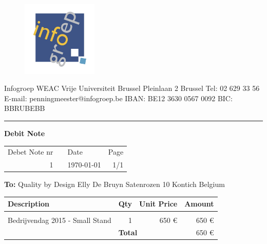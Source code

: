 \documentclass{letter}
\begin{document}
\begin{figure}
  \begin{center}
    \includegraphics[width=0.32\textwidth]{invoices/ig.jpg}
  \end{center}
\end{figure}

Infogroep
\newline
WEAC
\newline
Vrije Universiteit Brussel
\newline
Pleinlaan 2 
 Brussel
\newline
\newline
Tel: 02 629 33 56
\newline
E-mail: penningmeester@infogroep.be
\newline
\newline
IBAN: BE12 3630 0567 0092
\newline
BIC: BBRUBEBB

\rule{\textwidth}{1pt}
\newline


\textbf{\huge{
Debit Note
}}

\begin{tabular}{ r p{10cm} l r}
	Debet Note nr & & Date & Page \\
	1 & & \today & 1/1 \\
\end{tabular} 
\vspace{1cm}


\textbf{To:}
\newline
Quality by Design
\newline
Elly De Bruyn
\newline
Satenrozen 10
 Kontich
\newline
Belgium




\begin{tabular}{ |p{12cm} | r | r | r |}
	\hline
	\rowcolor{lightgray}
	Description & Qty & Unit Price & Amount \\ [2pt]
	\hline
	&&&\\
	Bedrijvendag 2015 - Small Stand & 1 & 650 \euro & 650  \euro \\[8cm]
	
	\hline
	
	 \multicolumn{1}{c}{}& \multicolumn{2}{|l|}{\cellcolor{lightgray} \textbf{Total}} & 650 \euro\\[2pt]
	\cline{2-4}
	
\end{tabular} 
\end{document}
